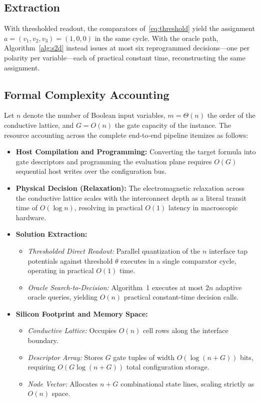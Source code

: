 \documentclass[letterpaper,journal]{IEEEtran}
\begin{document}
\subsection{Extraction}
With thresholded readout, the comparators of~\eqref{eq:threshold} yield
the assignment $a=(v_1,v_2,v_3)=(1,0,0)$ in the same cycle. With the
oracle path, Algorithm~\ref{alg:s2d} instead issues at most six
reprogrammed decisions---one per polarity per variable---each of
practical constant time, reconstructing the same assignment.

\subsection{Formal Complexity Accounting}
Let $n$ denote the number of Boolean input variables, $m = \Theta(n)$ the order of the conductive lattice, and $G = O(n)$ the gate capacity of the instance. The resource accounting across the complete end-to-end pipeline itemizes as follows:

\begin{itemize}
  \item \textbf{Host Compilation and Programming:} Converting the target formula into gate descriptors and programming the evaluation plane requires $O(G)$ sequential host writes over the configuration bus.
  \item \textbf{Physical Decision (Relaxation):} The electromagnetic relaxation across the conductive lattice scales with the interconnect depth as a literal transit time of $O(\log n)$, resolving in practical $O(1)$ latency in macroscopic hardware.
  \item \textbf{Solution Extraction:}
  \begin{itemize}
    \item \emph{Thresholded Direct Readout:} Parallel quantization of the $n$ interface tap potentials against threshold $\theta$ executes in a single comparator cycle, operating in practical $O(1)$ time.
    \item \emph{Oracle Search-to-Decision:} Algorithm~1 executes at most $2n$ adaptive oracle queries, yielding $O(n)$ practical constant-time decision calls.
  \end{itemize}
  \item \textbf{Silicon Footprint and Memory Space:}
  \begin{itemize}
    \item \emph{Conductive Lattice:} Occupies $O(n)$ cell rows along the interface boundary.
    \item \emph{Descriptor Array:} Stores $G$ gate tuples of width $O(\log(n+G))$ bits, requiring $O(G \log(n+G))$ total configuration storage.
    \item \emph{Node Vector:} Allocates $n + G$ combinational state lines, scaling strictly as $O(n)$ space.
  \end{itemize}
\end{itemize}
\end{document}
